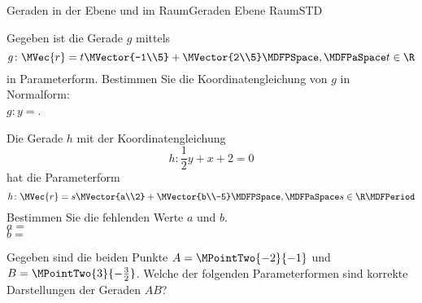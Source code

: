\begin{MXContent}{Geraden in der Ebene und im Raum}{Geraden Ebene Raum}{STD}
\begin{MExample}
\begin{itemize}
\begin{center}
{
} 
\end{center}
\end{itemize}

\end{MExample}

\begin{MExercise}
\begin{MExerciseItems}
\item{
Gegeben ist die Gerade $g$ mittels
\[
 g\colon \MVec{r}=t\MVector{-1\\5}+\MVector{2\\5}\MDFPSpace,\MDFPaSpace t\in\R
\]
in Parameterform. Bestimmen Sie die Koordinatengleichung von $g$ in Normalform:\\
$g\colon y=$.
}
\item{
Die Gerade $h$ mit der Koordinatengleichung
\[
 h\colon\frac{1}{2}y+x+2=0
\]
hat die Parameterform
\[
 h\colon \MVec{r}=s\MVector{a\\2}+\MVector{b\\-5}\MDFPSpace,\MDFPaSpace s\in\R \MDFPeriod
\]
Bestimmen Sie die fehlenden Werte $a$ und $b$.\\
$a=$\\
$b=$
}
\item{
Gegeben sind die beiden Punkte $A=\MPointTwo{-2}{-1}$ und $B=\MPointTwo{3}{-\frac{3}{2}}$. Welche der folgenden Parameterformen sind korrekte Darstellungen der Geraden $A B$?

}
\end{MExerciseItems}
\end{MExercise}
\end{MXContent}
